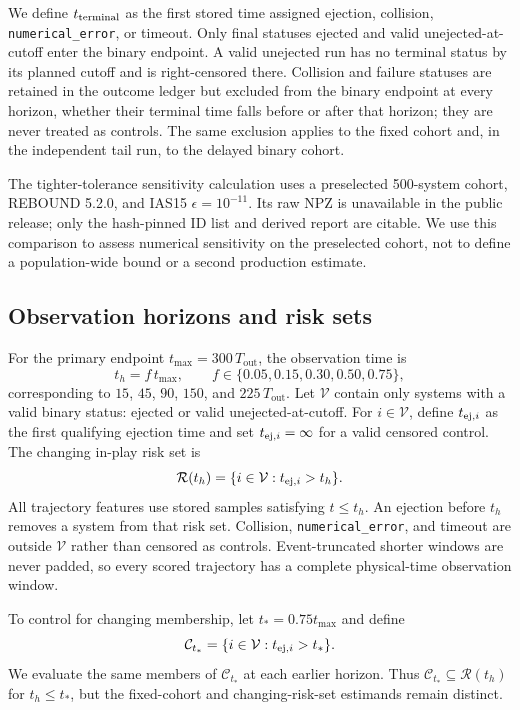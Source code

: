 \documentclass[linenumbers,twocolumn]{aastex702}
\newcommand{\Tout}{T_{\mathrm{out}}}
\begin{document}
We define $t_{\rm terminal}$ as the first stored time assigned ejection, collision, \texttt{numerical\_error}, or timeout. Only final statuses ejected and valid unejected-at-cutoff enter the binary endpoint. A valid unejected run has no terminal status by its planned cutoff and is right-censored there. Collision and failure statuses are retained in the outcome ledger but excluded from the binary endpoint at every horizon, whether their terminal time falls before or after that horizon; they are never treated as controls. The same exclusion applies to the fixed cohort and, in the independent tail run, to the delayed binary cohort.

The tighter-tolerance sensitivity calculation uses a preselected 500-system cohort, REBOUND 5.2.0, and IAS15 $\epsilon=10^{-11}$. Its raw NPZ is unavailable in the public release; only the hash-pinned ID list and derived report are citable. We use this comparison to assess numerical sensitivity on the preselected cohort, not to define a population-wide bound or a second production estimate.

\subsection{Observation horizons and risk sets}\label{sec:risksets}

For the primary endpoint $t_{\max}=300\,\Tout$, the observation time is
\begin{equation}
  t_h=f\,t_{\max}, \qquad
  f\in\{0.05,0.15,0.30,0.50,0.75\},
\end{equation}
corresponding to $15$, $45$, $90$, $150$, and $225\,\Tout$. Let $\mathcal{V}$ contain only systems with a valid binary status: ejected or valid unejected-at-cutoff. For $i\in\mathcal{V}$, define $t_{{\rm ej},i}$ as the first qualifying ejection time and set $t_{{\rm ej},i}=\infty$ for a valid censored control. The changing in-play risk set is
\begin{equation}
  \mathcal{R}(t_h)=\{i\in\mathcal{V}:t_{{\rm ej},i}>t_h\}.
\end{equation}
All trajectory features use stored samples satisfying $t\le t_h$. An ejection before $t_h$ removes a system from that risk set. Collision, \texttt{numerical\_error}, and timeout are outside $\mathcal{V}$ rather than censored as controls. Event-truncated shorter windows are never padded, so every scored trajectory has a complete physical-time observation window.

To control for changing membership, let $t_*=0.75t_{\max}$ and define
\begin{equation}
  \mathcal{C}_{t_*}=\{i\in\mathcal{V}:t_{{\rm ej},i}>t_*\}.
\end{equation}
We evaluate the same members of $\mathcal{C}_{t_*}$ at each earlier horizon. Thus $\mathcal{C}_{t_*}\subseteq\mathcal{R}(t_h)$ for $t_h\le t_*$, but the fixed-cohort and changing-risk-set estimands remain distinct.
\end{document}

